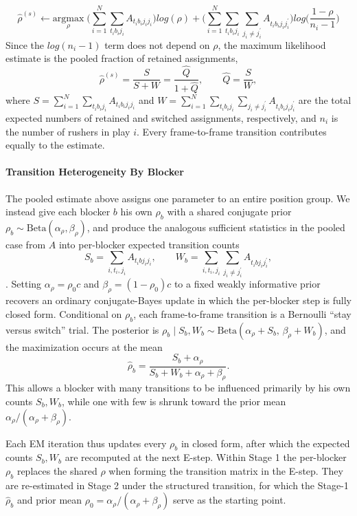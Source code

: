 \documentclass[USenglish]{article}
\theoremstyle{dgthm}
\theoremstyle{dgdef}
\begin{document}
\begin{appendices}
$$ \hat{\rho}^{(s)} \xleftarrow{} \underset{\rho}{\mathrm{argmax}} \; \Big(\sum_{i=1}^{N} \sum_{t_i b_i j_i} A_{t_ib_ij_ij_i}\Big) log(\rho) + \Big(\sum_{i=1}^{N} \sum_{t_i b_i j_i} \sum_{j_i \neq j_i^{'}} A_{t_ib_ij_ij_i^{'}}\Big) log\Big(\frac{1-\rho}{n_i - 1}\Big) $$
Since the $log(n_i - 1)$ term does not depend on $\rho$, the maximum likelihood estimate is the pooled fraction of retained assignments,
$$ \hat{\rho}^{(s)} = \frac{S}{S + W} = \frac{\hat{Q}}{1 + \hat{Q}}, \qquad \hat{Q} = \frac{S}{W}, $$
where $S = \sum_{i=1}^{N} \sum_{t_i b_i j_i} A_{t_ib_ij_ij_i}$ and $W = \sum_{i=1}^{N} \sum_{t_i b_i j_i} \sum_{j_i \neq j_i^{'}} A_{t_ib_ij_ij_i^{'}}$ are the total expected numbers of retained and switched assignments, respectively, and $n_i$ is the number of rushers in play $i$. Every frame-to-frame transition contributes equally to the estimate.

\paragraph{Transition Heterogeneity By Blocker}
The pooled estimate above assigns one parameter to an entire position group. We instead give each blocker $b$ his own $\rho_b$ with a shared conjugate prior $\rho_b \sim \text{Beta}(\alpha_\rho, \beta_\rho)$, and produce the analogous sufficient statistics in the pooled case from $A$ into per-blocker expected transition counts
$$ S_b = \sum_{i, t_i, j_i} A_{t_i b j_i j_i}, \qquad W_b = \sum_{i, t_i, j_i} \sum_{j_i \neq j_i^{'}} A_{t_i b j_i j_i^{'}}, $$
. Setting $\alpha_\rho = \rho_0 c$ and $\beta_\rho = (1-\rho_0) c$ to a fixed weakly informative prior recovers an ordinary conjugate-Bayes update in which the per-blocker step is fully closed form. Conditional on $\rho_b$, each frame-to-frame transition is a Bernoulli ``stay versus switch'' trial. The posterior is $\rho_b \mid S_b, W_b \sim \text{Beta}(\alpha_\rho + S_b,\, \beta_\rho + W_b)$, and the maximization occurs at the mean
$$ \hat{\rho}_b = \frac{S_b + \alpha_\rho}{S_b + W_b + \alpha_\rho + \beta_\rho}. $$
This allows a blocker with many transitions to be influenced primarily by his own counts $S_b, W_b$, while one with few is shrunk toward the prior mean $\alpha_\rho/(\alpha_\rho+\beta_\rho)$.

 Each EM iteration thus updates every $\rho_b$ in closed form, after which the expected counts $S_b, W_b$ are recomputed at the next E-step. Within Stage 1 the per-blocker $\rho_{b}$ replaces the shared $\rho$ when forming the transition matrix in the E-step. They are re-estimated in Stage 2 under the structured transition, for which the Stage-1 $\hat\rho_b$ and prior mean $\rho_0 = \alpha_\rho/(\alpha_\rho + \beta_\rho)$ serve as the starting point. 


\end{appendices}
\end{document}
